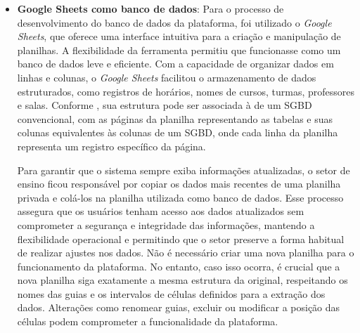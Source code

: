 \begin{itemize}
    \item \textbf{Google Sheets como banco de dados}: Para o processo de desenvolvimento do banco de dados da plataforma, foi utilizado o \textit{Google Sheets}, que oferece uma interface intuitiva para a criação e manipulação de planilhas. A flexibilidade da ferramenta permitiu que funcionasse como um banco de dados leve e eficiente. Com a capacidade de organizar dados em linhas e colunas, o \textit{Google Sheets} facilitou o armazenamento de dados estruturados, como registros de horários, nomes de cursos, turmas, professores e salas. Conforme , sua estrutura pode ser associada à de um SGBD convencional, com as páginas da planilha representando as tabelas e suas colunas equivalentes às colunas de um SGBD, onde cada linha da planilha representa um registro específico da página.

    Para garantir que o sistema sempre exiba informações atualizadas, o setor de ensino ficou responsável por copiar os dados mais recentes de uma planilha privada e colá-los na planilha utilizada como banco de dados. Esse processo assegura que os usuários tenham acesso aos dados atualizados sem comprometer a segurança e integridade das informações, mantendo a flexibilidade operacional e permitindo que o setor preserve a forma habitual de realizar ajustes nos dados. Não é necessário criar uma nova planilha para o funcionamento da plataforma. No entanto, caso isso ocorra, é crucial que a nova planilha siga exatamente a mesma estrutura da original, respeitando os nomes das guias e os intervalos de células definidos para a extração dos dados. Alterações como renomear guias, excluir ou modificar a posição das células podem comprometer a funcionalidade da plataforma.
    

\end{itemize}
